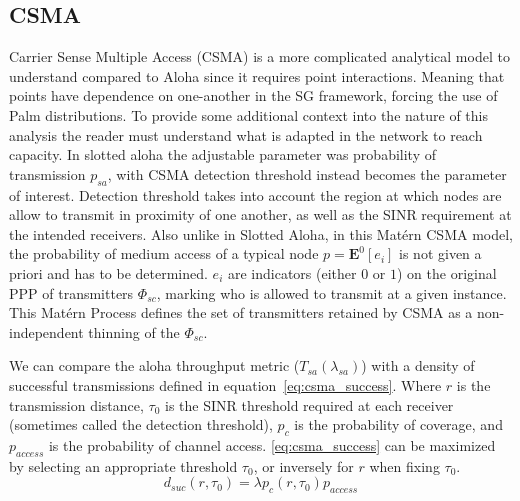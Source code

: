 \subsection{CSMA}
%
Carrier Sense Multiple Access (CSMA) is a more complicated analytical model to understand compared to Aloha since it requires point interactions.  Meaning that points have dependence on one-another in the SG framework, forcing the use of Palm distributions.  To provide some additional context into the nature of this analysis the reader must understand what is adapted in the network to reach capacity.  In slotted aloha the adjustable parameter was probability of transmission $p_{sa}$, with CSMA detection threshold instead becomes the parameter of interest.  Detection threshold takes into account the region at which nodes are allow to transmit in proximity of one another, as well as the SINR requirement at the intended receivers.  Also unlike in Slotted Aloha, in this Mat\'ern CSMA model, the probability of medium access of a typical node $p = \textbf{E}^0[e_i]$ is not given a priori and has to be determined.  $e_i$ are indicators (either $0$ or $1$) on the original PPP of transmitters $\Phi_{sc}$, marking who is allowed to transmit at a given instance.  This Mat\'ern Process defines the set of transmitters retained by CSMA
as a non-independent thinning of the $\Phi_{sc}$.
\par
%
We can compare the aloha throughput metric ($T_{sa}(\lambda_{sa})$) with a density of successful transmissions defined in equation~\eqref{eq:csma_success}. Where $r$ is the transmission distance, $\tau_0$ is the SINR threshold required at each receiver (sometimes called the detection threshold), $p_c$ is the probability of coverage, and $p_{access}$ is the probability of channel access.  \eqref{eq:csma_success} can be maximized by selecting an appropriate threshold $\tau_0$, or inversely for $r$ when fixing $\tau_0$.
%
\begin{equation}\label{eq:csma_success}
	d_{suc}(r,\tau_0) = \lambda p_c(r,\tau_0) p_{access}
\end{equation}
%

